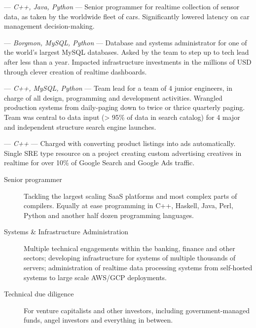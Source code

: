 \begin{langen}
\begin{description}%
\vspace{2 mm}
\item[Street View] --- \textit{C++, Java, Python} --- Senior programmer for realtime collection of sensor data, as taken by the worldwide fleet of cars. Significantly lowered latency on car management decision-making.
\item[Ads-SRE-DB] --- \textit{Borgmon, MySQL, Python} --- Database and systems administrator for one of the world's largest MySQL databases. Asked by the team to step up to tech lead after less than a year. Impacted infrastructure investments in the millions of USD through clever creation of realtime dashboards.
\item [Froogle \& Google Base] --- \textit{C++, MySQL, Python} --- Team lead for a team of 4 junior engineers, in charge of all design, programming and development activities. Wrangled production systems from daily-paging down to twice or thrice quarterly paging. Team was central to data input (> 95\% of data in search catalog) for 4 major and independent structure search engine launches.
\item[Ads/Deli] --- \textit{C++} --- Charged with converting product listings into ads automatically. Single SRE type resource on a project creating custom advertising creatives in realtime for over 10\% of Google Search and Google Ads traffic.
\end{description}
\end{langen}

\vspace{4 mm}

\begin{langen}
\begin{description}%
\item[Senior programmer] Tackling the largest scaling SaaS platforms and most complex parts of compilers. Equally at ease programming in C++, Haskell, Java, Perl, Python and another half dozen programming languages.
\item[Systems \& Infrastructure Administration] Multiple technical engagements within the banking, finance and other sectors; developing infrastructure for systems of multiple thousands of servers; administration of realtime data processing systems from self-hosted systems to large scale AWS/GCP deployments.
\item[Technical due diligence] For venture capitalists and other investors, including government-managed funds, angel investors and everything in between.
\end{description}
\end{langen}


